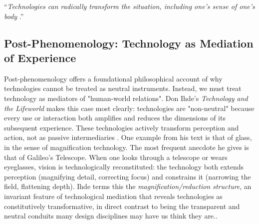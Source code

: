 \vspace{1.0em}
\enquote{\textit{Technologies can radically transform the situation, including one's sense of one's body} \parencite{Ihde_2002}.}
\vspace{1.0em}

\subsection{Post-Phenomenology: Technology as Mediation of Experience}

Post-phenomenology offers a foundational philosophical account of why technologies cannot be treated as neutral instruments. Instead, we must treat technology as mediators of "human-world relations". Don Ihde’s \emph{Technology and the Lifeworld} makes this case most clearly: technologies are "non-neutral" because every use or interaction both amplifies and reduces the dimensions of its subsequent experience. These technologies actively transform perception and action, not as passive intermediaries \parencite[p. 75]{Ihde_1990}. One example from his text is that of glass, in the sense of magnification technology. The most frequent anecdote he gives is that of Galileo's Telescope. When one looks through a telescope or wears eyeglasses, vision is technologically reconstituted: the technology both extends perception (magnifying detail, correcting focus) and constrains it (narrowing the field, flattening depth). Ihde terms this the \emph{magnification/reduction structure}, an invariant feature of technological mediation that reveals technologies as constitutively transformative, in direct contrast to being the transparent and neutral conduits many design disciplines may have us think they are.\parencite[pp. 75-76]{Ihde_1990}.

